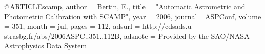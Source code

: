 
@ARTICLE{scamp,
   author = {{Bertin}, E.},
    title = "{Automatic Astrometric and Photometric Calibration with SCAMP}",
     year = 2006,
   journal= {ASPConf},
   volume = 351,
    month = jul,
    pages = {112},
   adsurl = {http://cdsads.u-strasbg.fr/abs/2006ASPC..351..112B},
  adsnote = {Provided by the SAO/NASA Astrophysics Data System}
}
